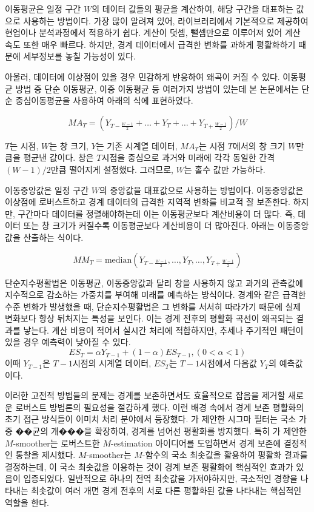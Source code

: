 \documentclass[letterpaper,12pt]{article}
\begin{document}
{이동평균은 일정 구간 $W$의 데이터 값들의 평균을 계산하여, 해당 구간을 대표하는 값으로 사용하는 방법이다. 가장 많이 알려져 있어, 라이브러리에서 기본적으로 제공하여 현업이나 분석과정에서 적용하기 쉽다. 계산이 덧셈, 뺄셈만으로 이루어져 있어 계산 속도 또한 매우 빠르다. 하지만, 경계 데이터에서 급격한 변화를 과하게 평활화하기 때문에 세부정보를 놓칠 가능성이 있다.


아울러, 데이터에 이상점이 있을 경우 민감하게 반응하여 왜곡이 커질 수 있다. 이동평균 방법 중 단순 이동평균, 이중 이동평균 등 여러가지 방법이 있는데 본 논문에서는 단순 중심이동평균을 사용하여 아래의 식에 표현하였다.

\[
MA_T = (Y_{T - \frac{W-1}{2}} + \dots + Y_T +\dots + Y_{T + \frac{W-1}{2}})/W
\]

$T$는 시점, $W$는 창 크기, $Y$는 기존 시계열 데이터, $MA_T$는 시점 $T$에서의 창 크기 $W$만큼을 평균낸 값이다. 창은 $T$시점을 중심으로 과거와 미래에 각각 동일한 간격 $(W-1)/2$만큼 떨어지게 설정했다. 그러므로, $W$는 홀수 값만 가능하다.

이동중앙값은 일정 구간 $W$의 중앙값을 대표값으로 사용하는 방법이다. 이동중앙값은 이상점에 로버스트하고 경계 데이터의 급격한 지역적 변화를 비교적 잘 보존한다. 하지만, 구간마다 데이터를 정렬해야하는데 이는 이동평균보다 계산비용이 더 많다. 즉, 데이터 또는 창 크기가 커질수록 이동평균보다 계산비용이 더 많아진다. 아래는 이동중앙값을 산출하는 식이다.

\[
MM_T = \mbox{median}(Y_{T - \frac{W-1}{2}} , \dots , Y_T , \dots , Y_{T + \frac{W-1}{2}})
\]

단순지수평활법은 이동평균, 이동중앙값과 달리 창을 사용하지 않고 과거의 관측값에 지수적으로 감소하는 가중치를 부여해 미래를 예측하는 방식이다. 경계와 같은 급격한 수준 변화가 발생했을 때, 단순지수평활법은 그 변화를 서서히 따라가기 때문에 실제 변화보다 항상 뒤처지는 특성을 보인다. 이는 경계 전후의 평활화 곡선이 왜곡되는 결과를 낳는다. 계산 비용이 적어서 실시간 처리에 적합하지만, 추세나 주기적인 패턴이 있을 경우 예측력이 낮아질 수 있다.
\[
ES_T= \alpha Y_{T-1} +(1-\alpha)ES_{T-1} , (0<\alpha<1)
\]
이때 $Y_{T-1}$은 $T-1$시점의 시계열 데이터, $ES_T$는 $T-1$시점에서 다음값 $Y_T$의 예측값이다. 

이러한 고전적 방법들의 문제는 경계를 보존하면서도 효율적으로 잡음을 제거할 새로운 로버스트 방법론의 필요성을 절감하게 했다. 이런 배경 속에서 경계 보존 평활화의 초기 접근 방식들이 이미치 처리 분야에서 등장했다. 
\cite{lee1983digital}가 제안한 시그마 필터는 국소 가중 ��균의 개���을 확장하여, 경계를 넘어선 평활화를 방지했다. 특히 \cite{chu1998edge}가 제안한 $M$-smoother는 로버스트한 $M$-estimation 아이디어를 도입하면서 경계 보존에 결정적인 통찰을 제시했다. $M$-smoother는 $M$-함수의 국소 최솟값을 활용하여 평활화 결과를 결정하는데, 이 국소 최솟값을 이용하는 것이 경계 보존 평활화에 핵심적인 효과가 있음이 입증되었다. 일반적으로 하나의 전역 최솟값을 가져야하지만, 국소적인 경향을 나타내는 최솟값이 여러 개면 경계 전후의 서로 다른 평활화된 값을 나타내는 핵심적인 역할을 한다.

}
\end{document}
